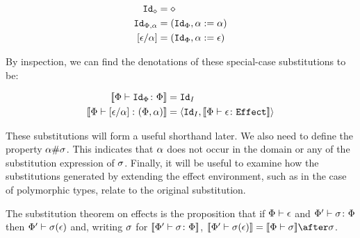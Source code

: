 \documentclass{Report}
\begin{document}
\begin{align}\label{SpecialSubs}
    \texttt{Id}_{\diamond} & = \diamond\\
    \texttt{Id}_{\Phi,\alpha} & = (\texttt{Id}_{\Phi}, \alpha:=\alpha)\\
    \left[\epsilon / \alpha\right] & = (\texttt{Id}_{\Phi}, \alpha:= \epsilon)
\end{align}

By inspection, we can find the denotations of these special-case substitutions to be:

\begin{align}\label{SpecialSubsDenotations}
    {\bf [\![}\Phi \vdash \texttt{Id}_{\Phi} \colon \Phi{\bf ]\!]} & = \texttt{Id}_{I}\\
    {\bf [\![}\Phi \vdash \left[\epsilon / \alpha\right] \colon (\Phi,\alpha){\bf ]\!]} & = \left\langle\texttt{Id}_{I}, {\bf [\![}\Phi \vdash \epsilon \colon \texttt{Effect}{\bf ]\!]}\right\rangle
\end{align}


These substitutions will form a useful shorthand later. We also need to define the property $\alpha \# \sigma$. This indicates that $\alpha$ does not occur in the domain or any of the substitution expression of $\sigma$. Finally, it will be useful to examine how the substitutions generated by extending the effect environment, such as in the case of polymorphic types, relate to the original substitution.




\begin{theorem}
    The substitution theorem on effects is the proposition that if $\Phi\vdash \epsilon$ and $\Phi' \vdash \sigma \colon \Phi$ then $\Phi'\vdash \sigma(\epsilon)$ and, writing $\sigma$ for ${\bf [\![}\Phi' \vdash \sigma \colon \Phi{\bf ]\!]}$,  $\deno{\wellformed{\P'}{\si(\e)}} = \deno{\wellformed{\P}{\si}}\after\si$. 
\end{theorem}
\end{document}
